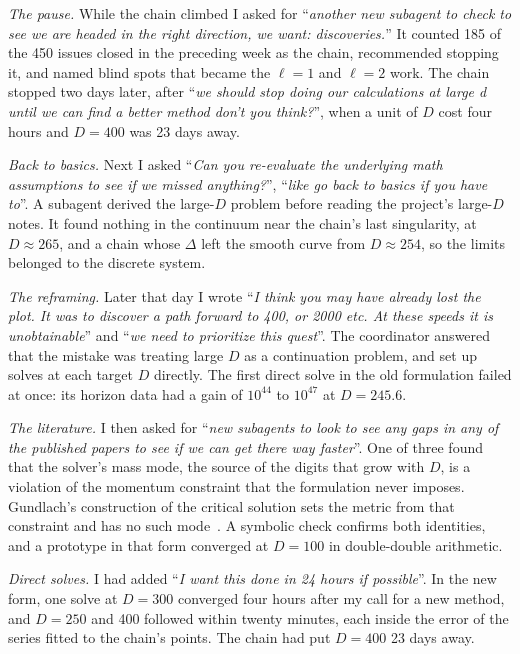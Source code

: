\documentclass[aps,prd,onecolumn,superscriptaddress,nofootinbib,10pt]{revtex4-2}
\newcommand{\prompt}[1]{``\textit{#1}''}
\begin{document}
\emph{The pause.} While the chain climbed I asked for \prompt{another new subagent to check to see we are headed in the
right direction, we want: discoveries.} It counted 185 of the 450 issues closed in the preceding week as the chain,
recommended stopping it, and named blind spots that became the $\ell = 1$ and $\ell = 2$ work. The chain stopped two days
later, after \prompt{we should stop doing our calculations at large d until we can find a better method don't you think?},
when a unit of $D$ cost four hours and $D = 400$ was 23 days away.

\emph{Back to basics.} Next I asked \prompt{Can you re-evaluate the underlying math assumptions to see if we missed
anything?}, \prompt{like go back to basics if you have to}. A subagent derived the large-$D$ problem before reading the
project's large-$D$ notes. It found nothing in the continuum near the chain's last singularity, at $D \approx 265$, and a
chain whose $\Delta$ left the smooth curve from $D \approx 254$, so the limits belonged to the discrete system.

\emph{The reframing.} Later that day I wrote \prompt{I think you may have already lost the plot. It was to discover a path
forward to 400, or 2000 etc. At these speeds it is unobtainable} and \prompt{we need to prioritize this quest}. The
coordinator answered that the mistake was treating large $D$ as a continuation problem, and set up solves at each target
$D$ directly. The first direct solve in the old formulation failed at once: its horizon data had a gain of $10^{44}$ to
$10^{47}$ at $D = 245.6$.

\emph{The literature.} I then asked for \prompt{new subagents to look to see any gaps in any of the published papers to see
if we can get there way faster}. One of three found that the solver's mass mode, the source of the digits that grow with
$D$, is a violation of the momentum constraint that the formulation never imposes. Gundlach's construction of the critical
solution sets the metric from that constraint and has no such mode~\cite{Gundlach1997}. A symbolic check confirms both
identities, and a prototype in that form converged at $D = 100$ in double-double arithmetic.

\emph{Direct solves.} I had added \prompt{I want this done in 24 hours if possible}. In the new form, one solve at
$D = 300$ converged four hours after my call for a new method, and $D = 250$ and 400 followed within twenty minutes, each inside
the error of the series fitted to the chain's points. The chain had put $D = 400$ 23 days away.
\end{document}
